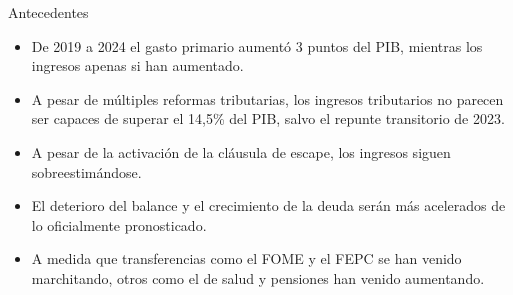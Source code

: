 \begin{frame}{Antecedentes}
\begin{itemize}
    \item  De 2019 a 2024 el gasto primario aumentó 3 puntos del PIB, mientras los ingresos apenas si han aumentado.
    \item A pesar de múltiples reformas tributarias, los ingresos tributarios no parecen ser capaces de superar el 14,5\% del PIB, salvo el repunte transitorio de 2023.

    \item A pesar de la activación de la cláusula de escape, los ingresos siguen sobreestimándose.
    \item El deterioro del balance y el crecimiento de la deuda serán más acelerados de lo oficialmente pronosticado.
    \item A medida que transferencias como el FOME y el FEPC se han venido marchitando, otros como el de salud y pensiones han venido aumentando.
\end{itemize}
\end{frame}
